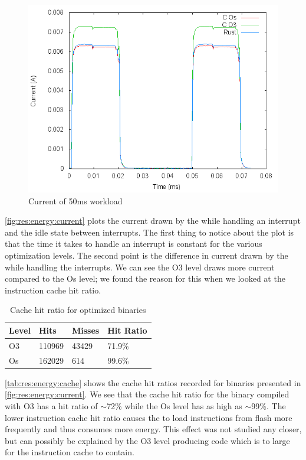 \begin{figure}[H]
  \includegraphics[width=\textwidth]{results/plots/energy/irq/50.png}
  \caption{Current of 50ms workload}
  \label{fig:res:energy:current}
\end{figure}

\autoref{fig:res:energy:current} plots the current drawn by the {\gecko} while handling an interrupt and the idle state between interrupts.
The first thing to notice about the plot is that the time it takes to handle an interrupt is constant for the various optimization levels.
The second point is the difference in current drawn by the {\gecko} while handling the interrupts.
We can see the O3 level draws more current compared to the Os level; we found the reason for this when we looked at the instruction cache hit ratio.

\begin{table}[H]
  \centering
  \begin{tabular}{l | l | l | l}
    \textbf{Level} & \textbf{Hits} & \textbf{Misses} & \textbf{Hit Ratio} \\
    \hline
    O3 & 110969 & 43429 & 71.9\% \\
    Os & 162029 & 614 & 99.6\% \\
    \hline
  \end{tabular}
  \caption{Cache hit ratio for optimized {\C} binaries}
  \label{tab:res:energy:cache}
\end{table}

\autoref{tab:res:energy:cache} shows the cache hit ratios recorded for binaries presented in \autoref{fig:res:energy:current}.
We see that the cache hit ratio for the binary compiled with O3 has a hit ratio of $\sim$72\% while the Os level has as high as $\sim$99\%.
The lower instruction cache hit ratio causes the {\gecko} to load instructions from flash more frequently and thus consumes more energy.
This effect was not studied any closer, but can possibly be explained by the O3 level producing code which is to large for the instruction cache to contain.
